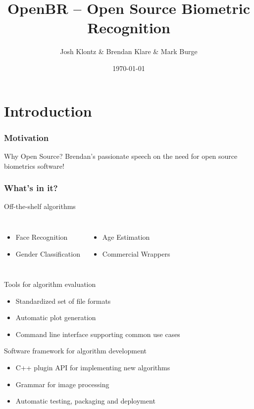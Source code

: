 \documentclass[12pt]{beamer}
\title[OpenBR]{OpenBR -- Open Source Biometric Recognition}
\author[J. Klontz \& B. Klare \& M. Burge]{Josh Klontz \& Brendan Klare \& Mark Burge}
\institute[]
{
www.openbiometrics.org \\
\medskip
{\emph{openbr-dev@googlegroups.com}}
}
\date{\today}
\begin{document}
\begin{frame}
\titlepage
\end{frame}

\section{Introduction}
\begin{frame}
\frametitle{Motivation}
\begin{block}
{Why Open Source?}
Brendan's passionate speech on the need for open source biometrics software!
\end{block}
\end{frame}

\begin{frame}
\frametitle{What's in it?}
\begin{block}{Off-the-shelf algorithms}
  \vspace{-6pt}
  \begin{columns}
    \begin{itemize}
    \item Face Recognition
    \item Gender Classification
    \end{itemize}
    \begin{itemize}
    \item Age Estimation
    \item Commercial Wrappers
    \end{itemize}
  \end{columns}
\end{block}
\pause
\begin{block}{Tools for algorithm evaluation}
  \begin{itemize}
  \item Standardized set of file formats
  \item Automatic plot generation
  \item Command line interface supporting common use cases
  \end{itemize}
\end{block}
\pause
\begin{block}{Software framework for algorithm development}
  \begin{itemize}
  \item C++ plugin API for implementing new algorithms
  \item Grammar for image processing
  \item Automatic testing, packaging and deployment
  \end{itemize}
\end{block}
\end{frame}
\end{document}
